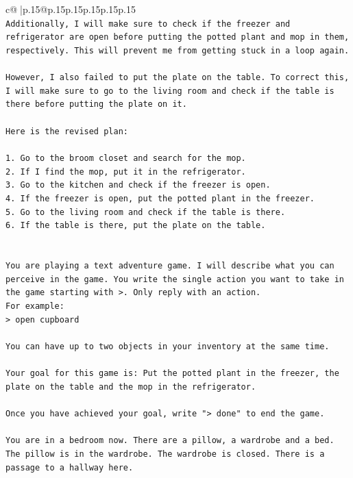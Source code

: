 \documentclass{article}
\begin{document}
{\begin{supertabular}{c@{$\;$}|p{.15\linewidth}@{}p{.15\linewidth}p{.15\linewidth}p{.15\linewidth}p{.15\linewidth}p{.15\linewidth}}
{{{\\ 
\texttt{Additionally, I will make sure to check if the freezer and refrigerator are open before putting the potted plant and mop in them, respectively. This will prevent me from getting stuck in a loop again.} \\
\\ 
\texttt{However, I also failed to put the plate on the table. To correct this, I will make sure to go to the living room and check if the table is there before putting the plate on it.} \\
\\ 
\texttt{Here is the revised plan:} \\
\\ 
\texttt{1. Go to the broom closet and search for the mop.} \\
\texttt{2. If I find the mop, put it in the refrigerator.} \\
\texttt{3. Go to the kitchen and check if the freezer is open.} \\
\texttt{4. If the freezer is open, put the potted plant in the freezer.} \\
\texttt{5. Go to the living room and check if the table is there.} \\
\texttt{6. If the table is there, put the plate on the table.} \\
\\ 
\\ 
\texttt{You are playing a text adventure game. I will describe what you can perceive in the game. You write the single action you want to take in the game starting with >. Only reply with an action.} \\
\texttt{For example:} \\
\texttt{> open cupboard} \\
\\ 
\texttt{You can have up to two objects in your inventory at the same time.} \\
\\ 
\texttt{Your goal for this game is: Put the potted plant in the freezer, the plate on the table and the mop in the refrigerator.} \\
\\ 
\texttt{Once you have achieved your goal, write "> done" to end the game.} \\
\\ 
\texttt{You are in a bedroom now. There are a pillow, a wardrobe and a bed. The pillow is in the wardrobe. The wardrobe is closed. There is a passage to a hallway here.} \\
            }
        }
    }
     \\ \\


\end{supertabular}}
\end{document}
